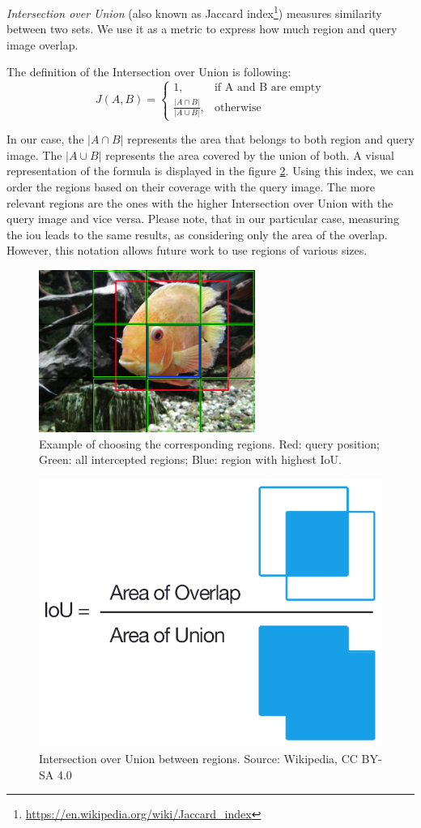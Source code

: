 \emph{Intersection over Union} (also known as Jaccard index\footnote{\href{https://en.wikipedia.org/wiki/Jaccard_index}{https://en.wikipedia.org/wiki/Jaccard\_index}}) measures similarity between two sets. We use it as a metric to express how much region and query image overlap. 

The definition of the Intersection over Union is following:
$$
    J(A, B) = 
    \begin{cases}
      1, & \text{if\ A and B are empty} \\
      \frac{|A \cap B|}{|A \cup B|}, & \text{otherwise}
    \end{cases}
$$

In our case, the $|A \cap B|$ represents the area that belongs to both region and query image. The  $|A \cup B|$ represents the area covered by the union of both. A visual representation of the formula is displayed in the figure \ref{fig:intersection_over_union}. Using this index, we can order the regions based on their coverage with the query image. The more relevant regions are the ones with the higher Intersection over Union with the query image and vice versa. Please note, that in our particular case, measuring the \acrshort{iou} leads to the same results, as considering only the area of the overlap. However, this notation allows future work to use regions of various sizes.

\begin{figure}
\centering
\includegraphics[width=0.63\textwidth]{img/fish_grid_regions}
\caption[Example of choosing the corresponding regions]{Example of choosing the corresponding regions. Red: query position; Green: all intercepted regions; Blue: region with highest IoU.}
\label{fig:fish_with_grid}
\end{figure}

\begin{figure}
    \centering
	\includegraphics[width=0.4\linewidth]{img/Intersection_over_Union_-_visual_equation.png}
	\caption[Intersection over Union between regions]{Intersection over Union between regions. Source: Wikipedia, CC BY-SA 4.0}
	\label{fig:intersection_over_union}
\end{figure}

